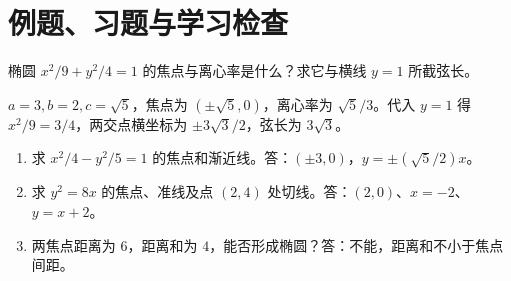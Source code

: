 \section{例题、习题与学习检查}
\begin{example}
椭圆 $x^2/9+y^2/4=1$ 的焦点与离心率是什么？求它与横线 $y=1$ 所截弦长。
\end{example}
\begin{solve}
$a=3,b=2,c=\sqrt5$，焦点为 $(\pm\sqrt5,0)$，离心率为 $\sqrt5/3$。代入 $y=1$ 得 $x^2/9=3/4$，两交点横坐标为 $\pm3\sqrt3/2$，弦长为 $3\sqrt3$。
\end{solve}
\begin{enumerate}
\item 求 $x^2/4-y^2/5=1$ 的焦点和渐近线。答：$(\pm3,0)$，$y=\pm(\sqrt5/2)x$。
\item 求 $y^2=8x$ 的焦点、准线及点 $(2,4)$ 处切线。答：$(2,0)$、$x=-2$、$y=x+2$。
\item 两焦点距离为 $6$，距离和为 $4$，能否形成椭圆？答：不能，距离和不小于焦点间距。
\end{enumerate}

